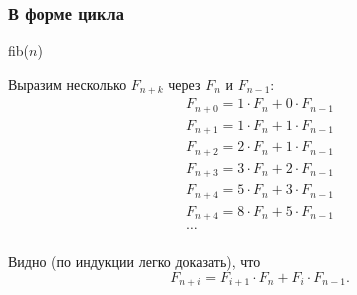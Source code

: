 \begin{frame}
    \frametitle{В форме цикла}
    
    \begin{algorithm}[H]
        \caption{fib($n$)}
        \begin{algorithmic}[1]
            
            \ENDWHILE
        \end{algorithmic}
    \end{algorithm}
\end{frame}

\begin{frame}
    \begin{center}
    \end{center}
\end{frame}

\begin{frame}
    Выразим несколько $F_{n+k}$ через $F_{n}$ и $F_{n-1}$:
    \[
        \begin{split}
            F_{n+0} = 1\cdot F_{n} + 0\cdot F_{n-1}\\
            F_{n+1} = 1\cdot F_{n} + 1\cdot F_{n-1}\\
            F_{n+2} = 2\cdot F_{n} + 1\cdot F_{n-1}\\
            F_{n+3} = 3\cdot F_{n} + 2\cdot F_{n-1}\\
            F_{n+4} = 5\cdot F_{n} + 3\cdot F_{n-1}\\
            F_{n+4} = 8\cdot F_{n} + 5\cdot F_{n-1}\\
            \ldots\\
        \end{split}
    \]
    
    Видно (по индукции легко доказать), что 
    \begin{equation}\label{eq:fib:nplusi}
        F_{n+i} = F_{i+1}\cdot F_{n} + F_{i}\cdot F_{n-1}.
    \end{equation}
\end{frame}

